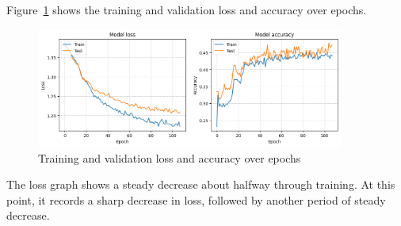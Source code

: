 
Figure~\ref{fig:loss_acc} shows the training and validation loss and accuracy
over epochs.
\begin{figure}[H]
    \centering
    \includegraphics[width=0.9\textwidth]{plotsss/ts_loss_acc.png}
    \caption{Training and validation loss and accuracy over epochs}
    \label{fig:loss_acc}
\end{figure}

The loss graph shows a steady decrease about halfway through training.
At this point, it records a sharp decrease in loss, followed by another
period of steady decrease.


